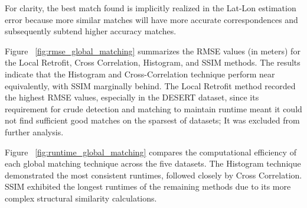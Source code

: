 For clarity, the best match found is implicitly realized in the Lat-Lon estimation error because more similar matches will have more accurate correspondences and subsequently subtend higher accuracy matches. 

Figure ~\ref{fig:rmse_global_matching} summarizes the RMSE values (in meters) for the Local Retrofit, Cross Correlation, Histogram, and SSIM methods. The results indicate that the Histogram and Cross-Correlation technique perform near equivalently, with SSIM marginally behind. The Local Retrofit method recorded the highest RMSE values, especially in the DESERT dataset, since its requirement for crude detection and matching to maintain runtime meant it could not find sufficient good matches on the sparsest of datasets; It was excluded from further analysis.

Figure ~\ref{fig:runtime_global_matching} compares the computational efficiency of each global matching technique across the five datasets. The Histogram technique demonstrated the most consistent runtimes, followed closely by Cross Correlation. SSIM exhibited the longest runtimes of the remaining methods due to its more complex structural similarity calculations. 


